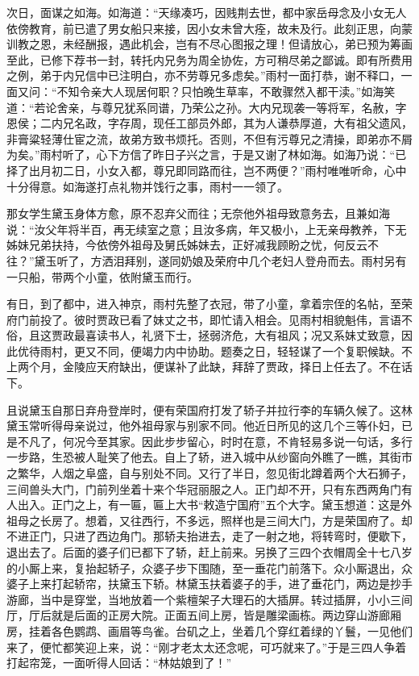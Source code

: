 \documentclass[12pt,oneside]{book}
\begin{document}
次日，面谋之如海。如海道：“天缘凑巧，因贱荆去世，都中家岳母念及小女无人依傍教育，前已遣了男女船只来接，因小女未曾大痊，故未及行。此刻正思，向蒙训教之恩，未经酬报，遇此机会，岂有不尽心图报之理！但请放心，弟已预为筹画至此，已修下荐书一封，转托内兄务为周全协佐，方可稍尽弟之鄙诚。即有所费用之例，弟于内兄信中已注明白，亦不劳尊兄多虑矣。”雨村一面打恭，谢不释口，一面又问：“不知令亲大人现居何职？只怕晚生草率，不敢骤然入都干渎。”如海笑道：“若论舍亲，与尊兄犹系同谱，乃荣公之孙。大内兄现袭一等将军，名赦，字恩侯；二内兄名政，字存周，现任工部员外郎，其为人谦恭厚道，大有祖父遗风，非膏粱轻薄仕宦之流，故弟方致书烦托。否则，不但有污尊兄之清操，即弟亦不屑为矣。”雨村听了，心下方信了昨日子兴之言，于是又谢了林如海。如海乃说：“已择了出月初二日，小女入都，尊兄即同路而往，岂不两便？”雨村唯唯听命，心中十分得意。如海遂打点礼物并饯行之事，雨村一一领了。

那女学生黛玉身体方愈，原不忍弃父而往；无奈他外祖母致意务去，且兼如海说：“汝父年将半百，再无续室之意；且汝多病，年又极小，上无亲母教养，下无姊妹兄弟扶持，今依傍外祖母及舅氏姊妹去，正好减我顾盼之忧，何反云不往？”黛玉听了，方洒泪拜别，遂同奶娘及荣府中几个老妇人登舟而去。雨村另有一只船，带两个小童，依附黛玉而行。

有日，到了都中，进入神京，雨村先整了衣冠，带了小童，拿着宗侄的名帖，至荣府门前投了。彼时贾政已看了妹丈之书，即忙请入相会。见雨村相貌魁伟，言语不俗，且这贾政最喜读书人，礼贤下士，拯弱济危，大有祖风；况又系妹丈致意，因此优待雨村，更又不同，便竭力内中协助。题奏之日，轻轻谋了一个复职候缺。不上两个月，金陵应天府缺出，便谋补了此缺，拜辞了贾政，择日上任去了。不在话下。

且说黛玉自那日弃舟登岸时，便有荣国府打发了轿子并拉行李的车辆久候了。这林黛玉常听得母亲说过，他外祖母家与别家不同。他近日所见的这几个三等仆妇，已是不凡了，何况今至其家。因此步步留心，时时在意，不肯轻易多说一句话，多行一步路，生恐被人耻笑了他去。自上了轿，进入城中从纱窗向外瞧了一瞧，其街市之繁华，人烟之阜盛，自与别处不同。又行了半日，忽见街北蹲着两个大石狮子，三间兽头大门，门前列坐着十来个华冠丽服之人。正门却不开，只有东西两角门有人出入。正门之上，有一匾，匾上大书“敕造宁国府”五个大字。黛玉想道：这是外祖母之长房了。想着，又往西行，不多远，照样也是三间大门，方是荣国府了。却不进正门，只进了西边角门。那轿夫抬进去，走了一射之地，将转弯时，便歇下，退出去了。后面的婆子们已都下了轿，赶上前来。另换了三四个衣帽周全十七八岁的小厮上来，复抬起轿子，众婆子步下围随，至一垂花门前落下。众小厮退出，众婆子上来打起轿帘，扶黛玉下轿。林黛玉扶着婆子的手，进了垂花门，两边是抄手游廊，当中是穿堂，当地放着一个紫檀架子大理石的大插屏。转过插屏，小小三间厅，厅后就是后面的正房大院。正面五间上房，皆是雕梁画栋。两边穿山游廊厢房，挂着各色鹦鹉、画眉等鸟雀。台矶之上，坐着几个穿红着绿的丫鬟，一见他们来了，便忙都笑迎上来，说：“刚才老太太还念呢，可巧就来了。”于是三四人争着打起帘笼，一面听得人回话：“林姑娘到了！”
\end{document}
